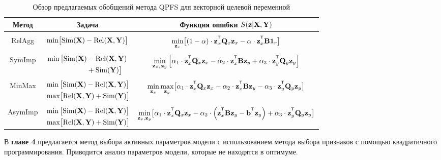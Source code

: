 \documentclass[11pt, a5paper]{dissert}
\begin{document}
\begin{table}[ht]
	\centering
	\caption{Обзор предлагаемых обобщений метода QPFS для векторной целевой переменной}
	\small{
		\begin{tabular}{c|c|c}
			\hline
			Метод & Задача & Функция ошибки $S(\mathbf{z} | \mathbf{X}, \mathbf{Y})$ \\
			\hline && \\ [-.5em]
			RelAgg & $\min \bigl[ \text{Sim}(\mathbf{X}) - \text{Rel}(\mathbf{X}, \mathbf{Y}) \bigr] $ & $\min\limits_{\bz_x} \bigl[ (1 - \alpha) \cdot \bz_x^{\T} \bQ_x \bz_x - \alpha \cdot \bz_x^{\T} \bB \bOne_r \bigr] $ \\ &&\\[-.5em]
			SymImp & $\begin{aligned} \min \, \bigl[ \text{Sim}(\mathbf{X}) & - \text{Rel}(\mathbf{X}, \mathbf{Y}) \\ & + \text{Sim}(\mathbf{Y}) \bigr] \end{aligned}$ & $ \min\limits_{\bz_x, \, \bz_y} \left[ \alpha_1 \cdot \bz_x^{\T} \bQ_x \bz_x - \alpha_2 \cdot \bz_x^{\T} \bB \bz_y + \alpha_3 \cdot \bz_y^{\T} \bQ_y \bz_y \right] $\\ &&\\ [-.5em]
			MinMax & $\begin{aligned} &\min \, \bigl[ \text{Sim}(\mathbf{X}) - \text{Rel}(\mathbf{X}, \mathbf{Y}) \bigr]  \\ & \max \bigl[\text{Rel}(\mathbf{X}, \mathbf{Y}) + \text{Sim}(\mathbf{Y}) \bigr] \end{aligned}$ & $	\min\limits_{\bz_x} 	\max\limits_{\bz_y} \bigl[\alpha_1 \cdot \bz_x^{\T} \bQ_x \bz_x - \alpha_2 \cdot \bz_x^{\T} \bB \bz_y - \alpha_3 \cdot \bz_y^{\T} \bQ_y \bz_y \bigr]$ \\ &&\\ [-.5em]
			AsymImp & $\begin{aligned} & \min \, \bigl[ \text{Sim}(\mathbf{X}) - \text{Rel}(\mathbf{X}, \mathbf{Y}) \bigr]\\ &  \max \bigl[\text{Rel}(\mathbf{X}, \mathbf{Y}) + \text{Sim}(\mathbf{Y}) \bigr] \end{aligned}$ & $\min\limits_{\bz_x, \bz_y} \bigl[ \alpha_1 \cdot \bz_x^{\T} \bQ_x \bz_x - \alpha_2 \cdot \left(\bz_x^{\T} \bB \bz_y - \bb^{\T} \bz_y \right) + \alpha_3 \cdot \bz_y^{\T} \bQ_y \bz_y \bigr]$\\ 
			\hline
	\end{tabular}}
	\label{ch3:tbl:summary}
\end{table}

В \textbf{главе 4} предлагается метод выбора активных параметров модели с использованием метода выбора признаков с помощью квадратичного программирования. 
Приводится анализ параметров модели, которые не находятся в оптимуме.
\end{document}
